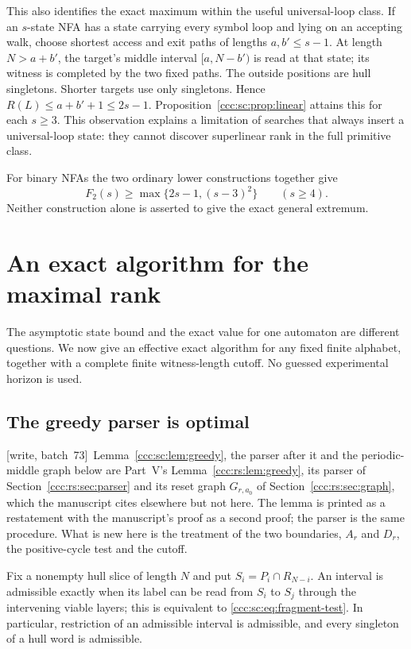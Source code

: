 \documentclass[11pt,letterpaper]{article}
\theoremstyle{definition}
\theoremstyle{remark}
\newcommand{\wsevthree}{\textup{[write, batch~73]}}
\begin{document}
This also identifies the exact maximum within the useful universal-loop class. If an $s$-state NFA has a state carrying every symbol loop and lying on an accepting walk, choose shortest access and exit paths of lengths $a,b'\le s-1$. At length $N>a+b'$, the target's middle interval $[a,N-b')$ is read at that state; its witness is completed by the two fixed paths. The outside positions are hull singletons. Shorter targets use only singletons. Hence $R(L)\le a+b'+1\le2s-1$. Proposition~\ref{ccc:sc:prop:linear} attains this for each $s\ge3$. This observation explains a limitation of searches that always insert a universal-loop state: they cannot discover superlinear rank in the full primitive class.

For binary NFAs the two ordinary lower constructions together give
\[
 F_2(s)\ge\max\{2s-1,(s-3)^2\}\qquad(s\ge4).
\]
Neither construction alone is asserted to give the exact general extremum.

\section{An exact algorithm for the maximal rank}\label{ccc:sc:sec:exact}

The asymptotic state bound and the exact value for one automaton are different questions. We now give an effective exact algorithm for any fixed finite alphabet, together with a complete finite witness-length cutoff. No guessed experimental horizon is used.

\subsection{The greedy parser is optimal}

\wsevthree\ Lemma~\ref{ccc:sc:lem:greedy}, the parser after it and the
periodic-middle graph below are Part~V's Lemma~\ref{ccc:rs:lem:greedy}, its
parser of Section~\ref{ccc:rs:sec:parser} and its reset graph
$G_{r,a_0}$ of Section~\ref{ccc:rs:sec:graph}, which the manuscript cites
elsewhere but not here. The lemma is printed as a restatement with the
manuscript's proof as a second proof; the parser is the same procedure. What
is new here is the treatment of the two boundaries, $A_r$ and $D_r$, the
positive-cycle test and the cutoff.

Fix a nonempty hull slice of length $N$ and put $S_i=P_i\cap R_{N-i}$. An interval is admissible exactly when its label can be read from $S_i$ to $S_j$ through the intervening viable layers; this is equivalent to \eqref{ccc:sc:eq:fragment-test}. In particular, restriction of an admissible interval is admissible, and every singleton of a hull word is admissible.
\end{document}
